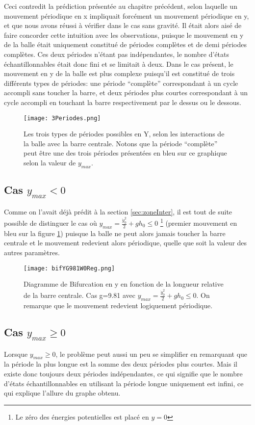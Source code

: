 \documentclass[a4paper]{report}
\begin{document}
Ceci contredit la prédiction présentée au chapitre précédent, selon laquelle un mouvement périodique en x impliquait forcément un mouvement périodique en y, et que nous avons réussi à vérifier dans le cas sans gravité. Il était alors aisé de faire concorder cette intuition avec les observations, puisque le mouvement en y de la balle était uniquement constitué de périodes complètes et de demi périodes complètes. Ces deux périodes n'étant pas indépendantes, le nombre d'états échantillonnables était donc fini et se limitait à deux. Dans le cas présent, le mouvement en y de la balle est plus complexe puisqu'il est constitué de trois différents types de périodes: une période ``complète'' correspondant à un cycle accompli sans toucher la barre, et deux périodes plus courtes correspondant à un cycle accompli en touchant la barre respectivement par le dessus ou le dessous.
\begin{figure}[h!]
   \texttt{[image: 3Periodes.png]}
      \caption[Les trois types de périodes possible en Y]{Les trois types de périodes possibles en Y, selon les interactions de la balle avec la barre centrale. Notons que la période ``complète'' peut être une des trois périodes présentées en bleu sur ce graphique selon la valeur de \(y_{max}\).}
   \label{fig:typesPeriodes}
\end{figure}

\subsection{Cas $ y_{max}<0 $}
Comme on l'avait déjà prédit à la section \ref{sec:zoneInter}, il est tout de suite possible de distinguer le cas où \(y_{max}=\frac{\dot{y}_0^2}{2} + gh_0 \leq 0\) \footnote{Le zéro des énergies potentielles est placé en \(y=0\)} (premier mouvement en bleu sur la figure \ref{fig:typesPeriodes}) puisque la balle ne peut alors jamais toucher la barre centrale et le mouvement redevient alors périodique, quelle que soit la valeur des autres paramètres.
\begin{figure}[H]
   \texttt{[image: bifYG981W0Reg.png]}
      \caption[Diagramme de Bifurcation en y: g=9.81 \( \omega=0 \; \, y_{max} \leq 0\)]{Diagramme de Bifurcation en y en fonction de la longueur relative de la barre centrale. Cas g=9.81 avec \(y_{max}=\frac{\dot{y}_0^2}{2} + gh_0 \leq 0\). On remarque que le mouvement redevient logiquement périodique.}
\end{figure}

\subsection{Cas $ y_{max} \geq 0 $}
Lorsque \(y_{max}\geq 0\), le problème peut aussi un peu se simplifier en remarquant que la période la plus longue est la somme des deux périodes plus courtes\label{propr:sommePeriodes}. Mais il existe donc toujours deux périodes indépendantes, ce qui signifie que le nombre d'états échantillonnables en utilisant la période longue uniquement est infini, ce qui explique l'allure du graphe obtenu.
\end{document}
